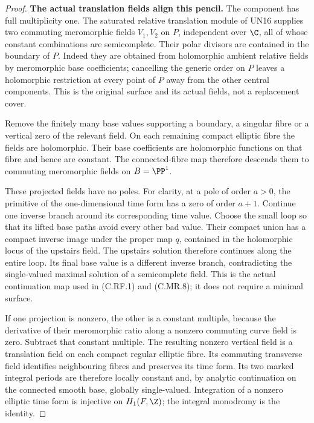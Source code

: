 \begin{proof}
\par\medskip\noindent\textbf{The actual translation fields align this pencil.}
The component has full multiplicity one.
The saturated relative translation module
of UN16 supplies two commuting meromorphic
fields \(V_1,V_2\) on \(P\), independent over
\(\C\), all of whose constant combinations
are semicomplete. Their polar divisors
are contained in the boundary of \(P\).
Indeed they are obtained from holomorphic
ambient relative fields by meromorphic
base coefficients; cancelling the generic
order on \(P\) leaves a holomorphic
restriction at every point of \(P\)
away from the other central components.
This is the original surface and its
actual fields, not a replacement cover.

Remove the finitely many base values
supporting a boundary, a singular fibre
or a vertical zero of the relevant field.
On each remaining compact elliptic fibre
the fields are holomorphic. Their base
coefficients are holomorphic functions
on that fibre and hence are constant.
The connected-fibre map therefore
descends them to commuting meromorphic
fields on \(B=\PP^1\).

These projected fields have no poles.
For clarity, at a pole of order \(a>0\),
the primitive of the one-dimensional
time form has a zero of order \(a+1\).
Continue one inverse branch around
its corresponding time value. Choose
the small loop so that its lifted
base paths avoid every other bad
value. Their compact union has a
compact inverse image under the proper
map \(q\), contained in the holomorphic
locus of the upstairs field. The
upstairs solution therefore continues
along the entire loop. Its final
base value is a different inverse
branch, contradicting the
single-valued maximal solution of
a semicomplete field. This is the
actual continuation map used in
(C.RF.1) and (C.MR.8); it does
not require a minimal surface.

If one projection is nonzero,
the other is a constant multiple,
because the derivative of their
meromorphic ratio along a nonzero
commuting curve field is zero.
Subtract that constant multiple.
The resulting nonzero vertical
field is a translation field on
each compact regular elliptic fibre.
Its commuting transverse field
identifies neighbouring fibres and
preserves its time form. Its two
marked integral periods are
therefore locally constant and,
by analytic continuation on the
connected smooth base, globally
single-valued. Integration of a
nonzero elliptic time form is
injective on \(H_1(F,\Z)\);
the integral monodromy is the
identity.


\end{proof}
